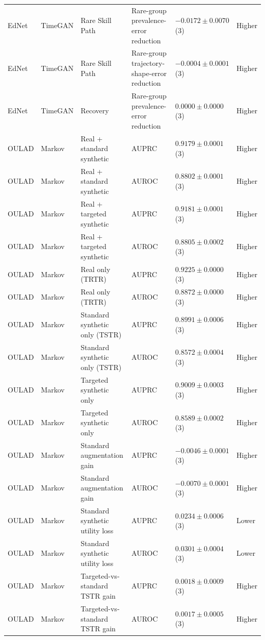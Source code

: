 \begin{longtable}{@{}p{2.25cm}p{2.05cm}p{4.7cm}p{5.0cm}p{2.6cm}p{1.25cm}@{}}
EdNet & TimeGAN & Rare Skill Path & Rare-group prevalence-error reduction & $-0.0172 \mathbin{\pm} 0.0070$ (3) & Higher \\
EdNet & TimeGAN & Rare Skill Path & Rare-group trajectory-shape-error reduction & $-0.0004 \mathbin{\pm} 0.0001$ (3) & Higher \\
EdNet & TimeGAN & Recovery & Rare-group prevalence-error reduction & $0.0000 \mathbin{\pm} 0.0000$ (3) & Higher \\
OULAD & Markov & Real + standard synthetic & AUPRC & $0.9179 \mathbin{\pm} 0.0001$ (3) & Higher \\
OULAD & Markov & Real + standard synthetic & AUROC & $0.8802 \mathbin{\pm} 0.0001$ (3) & Higher \\
OULAD & Markov & Real + targeted synthetic & AUPRC & $0.9181 \mathbin{\pm} 0.0001$ (3) & Higher \\
OULAD & Markov & Real + targeted synthetic & AUROC & $0.8805 \mathbin{\pm} 0.0002$ (3) & Higher \\
OULAD & Markov & Real only (TRTR) & AUPRC & $0.9225 \mathbin{\pm} 0.0000$ (3) & Higher \\
OULAD & Markov & Real only (TRTR) & AUROC & $0.8872 \mathbin{\pm} 0.0000$ (3) & Higher \\
OULAD & Markov & Standard synthetic only (TSTR) & AUPRC & $0.8991 \mathbin{\pm} 0.0006$ (3) & Higher \\
OULAD & Markov & Standard synthetic only (TSTR) & AUROC & $0.8572 \mathbin{\pm} 0.0004$ (3) & Higher \\
OULAD & Markov & Targeted synthetic only & AUPRC & $0.9009 \mathbin{\pm} 0.0003$ (3) & Higher \\
OULAD & Markov & Targeted synthetic only & AUROC & $0.8589 \mathbin{\pm} 0.0002$ (3) & Higher \\
OULAD & Markov & Standard augmentation gain & AUPRC & $-0.0046 \mathbin{\pm} 0.0001$ (3) & Higher \\
OULAD & Markov & Standard augmentation gain & AUROC & $-0.0070 \mathbin{\pm} 0.0001$ (3) & Higher \\
OULAD & Markov & Standard synthetic utility loss & AUPRC & $0.0234 \mathbin{\pm} 0.0006$ (3) & Lower \\
OULAD & Markov & Standard synthetic utility loss & AUROC & $0.0301 \mathbin{\pm} 0.0004$ (3) & Lower \\
OULAD & Markov & Targeted-vs-standard TSTR gain & AUPRC & $0.0018 \mathbin{\pm} 0.0009$ (3) & Higher \\
OULAD & Markov & Targeted-vs-standard TSTR gain & AUROC & $0.0017 \mathbin{\pm} 0.0005$ (3) & Higher \\

\end{longtable}
